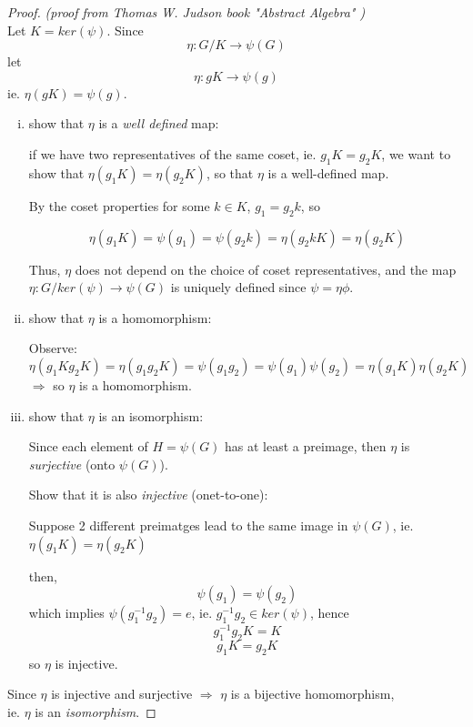 \documentclass{article}
\theoremstyle{definition}
\begin{document}
\begin{proof}
  \emph{(proof from Thomas W. Judson book "Abstract Algebra" \cite{judson})}\\

  Let $K=ker(\psi)$.
  Since
  $$\eta: G/K \longrightarrow \psi(G)$$
  let
  $$\eta: gK \longrightarrow \psi(g)$$
  ie. $\eta(gK)=\psi(g)$.

  \begin{enumerate}[i.]
    \item show that $\eta$ is a \emph{well defined} map:

      if we have two representatives of the same coset, ie. $g_1 K=g_2 K$, we want to show that $\eta(g_1 K) = \eta(g_2 K)$, so that $\eta$ is a well-defined map.
      
      \vspace{0.3cm}
      By the coset properties for some $k \in K$, $g_1=g_2 k$, so

      $$\eta(g_1K)=\psi(g_1) = \psi(g_2 k) = \eta(g_2 k K) = \eta(g_2 K)$$

      Thus, $\eta$ does not depend on the choice of coset representatives, and
      the map $\eta: G/ker(\psi) \longrightarrow \psi(G)$ is uniquely defined
      since $\psi=\eta\phi$.

    \item show that $\eta$ is a homomorphism:

      Observe:
      $$\eta(g_1 K g_2 K) = \eta(g_1 g_2 K) = \psi(g_1 g_2) = \psi(g_1) \psi(g_2) = \eta(g_1 K) \eta(g_2 K)$$
      $\Longrightarrow$ so $\eta$ is a homomorphism.

    \item show that $\eta$ is an isomorphism:

      Since each element of $H=\psi(G)$ has at least a preimage, then $\eta$ is \emph{surjective} (onto $\psi(G)$).

      Show that it is also \emph{injective} (onet-to-one):
      
      Suppose 2 different preimatges lead to the same image in $\psi(G)$, ie.
      $\eta(g_1 K) = \eta(g_2 K)$

      then,
      $$\psi(g_1) = \psi(g_2)$$
      which implies $\psi(g_1^{-1} g_2) = e$, ie. $g_1^{-1} g_2 \in ker(\psi)$,
      hence
      $$g_1^{-1} g_2 K = K$$
      $$g_1 K = g_2 K$$
      so $\eta$ is injective.
  \end{enumerate}

  Since $\eta$ is injective and surjective $\Longrightarrow$ $\eta$ is a bijective homomorphism,\\
  ie. $\eta$ is an \emph{isomorphism}.
\end{proof}
\end{document}
